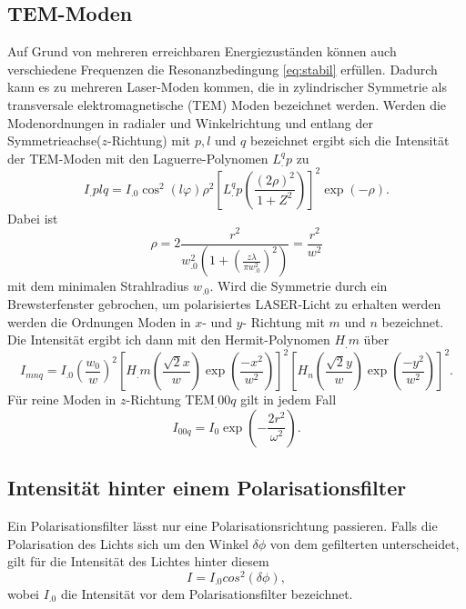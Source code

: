 \subsection{TEM-Moden}
Auf Grund von mehreren erreichbaren Energiezuständen können auch verschiedene Frequenzen die Resonanzbedingung \eqref{eq:stabil} erfüllen. Dadurch kann es zu mehreren Laser-Moden kommen, die in zylindrischer Symmetrie als transversale elektromagnetische (TEM) Moden bezeichnet werden.
Werden die Modenordnungen in radialer und Winkelrichtung und entlang der Symmetrieachse($z$-Richtung) mit $p, l$ und $q$ bezeichnet ergibt sich die Intensität der TEM-Moden mit den Laguerre-Polynomen $L^q_.p$ zu
\begin{equation}
I_.{plq} = I_.0 \cos^2 (l \varphi) \rho^2 \left[L^q_.{p}\left(\frac{(2 \rho)^2}{1+Z^2} \right)\right] ^2 \exp\left(-\rho \right)\text{.} \label{eq:intens}
\end{equation}
Dabei ist
\[
\rho = 2 \frac{r^2}{w^2_.0 \left(1+\left(\frac{z \lambda}{\pi w_.0^2}\right)^2\right)} = \frac{r^2}{w^2}
\]
mit dem minimalen Strahlradius $w_.0$.
Wird die Symmetrie durch ein Brewsterfenster gebrochen, um polarisiertes LASER-Licht zu erhalten werden werden die Ordnungen Moden in $x$- und $y$- Richtung mit $m$ und $n$ bezeichnet.
Die Intensität ergibt ich dann mit den Hermit-Polynomen $H_.m$ über
\begin{equation}
I_{mnq} = I_.0 \left(\frac{w_0}{w}\right)^2 \left[H_.m\left(\frac{\sqrt{2} x}{w}\right) \exp\left(\frac{-x^2}{w^2}\right) \right]^2 \left[H_n\left(\frac{\sqrt{2} y}{w}\right) \exp\left(\frac{-y^2}{w^2}\right) \right]^2\text{.}
\label{eq:intens2}
\end{equation}
Für reine Moden in $z$-Richtung $\text{TEM}_.{00q}$ gilt in jedem Fall
\begin{equation}
I_{00q} = I_0 \exp\left(-\frac{2 r^2}{\omega ^2}\right)\text{.} \label{eq:gaus}
\end{equation}

\subsection{Intensität hinter einem Polarisationsfilter}
Ein Polarisationsfilter lässt nur eine Polarisationsrichtung passieren. Falls die Polarisation des Lichts sich um den Winkel $\delta\phi$ von dem gefilterten unterscheidet, gilt für die Intensität des Lichtes hinter diesem
\begin{equation}
	I=I_.0 cos^2(\delta\phi), \label{eq:polar}
\end{equation}
wobei $I_.0$ die Intensität vor dem Polarisationsfilter bezeichnet.


